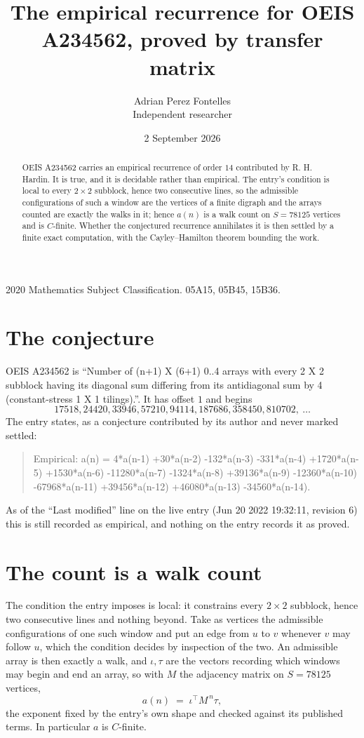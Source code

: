 \documentclass[11pt,a4paper]{article}
\title{The empirical recurrence for OEIS A234562, proved by transfer matrix}
\author{Adrian Perez Fontelles\\ \small Independent researcher}
\date{2 September 2026}
\theoremstyle{plain}
\theoremstyle{definition}
\begin{document}
\maketitle

\begin{abstract}
OEIS A234562 carries an empirical recurrence of order $14$ contributed by R. H. Hardin. It is
true, and it is decidable rather than empirical. The entry's condition is local to every $2\times2$ subblock, hence two consecutive lines, so
the admissible configurations of such a window are the vertices of a finite digraph and the
arrays counted are exactly the walks in it; hence $a(n)$ is a walk count on $S=78125$ vertices
and is $C$-finite. Whether the conjectured recurrence annihilates it is then settled by a
finite exact computation, with the Cayley--Hamilton theorem bounding the work.
\end{abstract}

\noindent\small 2020 Mathematics Subject Classification. 05A15, 05B45, 15B36.\normalsize

\section{The conjecture}

OEIS A234562 is ``Number of (n+1) X (6+1) 0..4 arrays with every 2 X 2 subblock having its diagonal sum differing from its antidiagonal sum by 4 (constant-stress 1 X 1 tilings).''. It has offset $1$ and begins
\[
17518, 24420, 33946, 57210, 94114, 187686, 358450, 810702,\ \dots
\]
The entry states, as a conjecture contributed by its author and never marked settled:
\begin{quote}
Empirical: a(n) = 4*a(n-1) +30*a(n-2) -132*a(n-3) -331*a(n-4) +1720*a(n-5) +1530*a(n-6) -11280*a(n-7) -1324*a(n-8) +39136*a(n-9) -12360*a(n-10) -67968*a(n-11) +39456*a(n-12) +46080*a(n-13) -34560*a(n-14).
\end{quote}
As of the ``Last modified'' line on the live entry (Jun 20 2022 19:32:11, revision 6) this is still
recorded as empirical, and nothing on the entry records it as proved.

\section{The count is a walk count}

The condition the entry imposes is local: it constrains every $2\times2$ subblock, hence two consecutive lines and nothing beyond. Take as vertices the admissible configurations of one such window and put an edge from $u$ to $v$ whenever $v$ may follow $u$, which the condition decides by inspection of the two.
An admissible array is then exactly a walk, and $\iota,\tau$ are the vectors recording which windows may begin and end an array, so with $M$ the adjacency matrix on $S=78125$ vertices,
\[
a(n)\;=\;\iota^{\!\top}M^{\,n}\tau ,
\]
the exponent fixed by the entry's own shape and checked against its published terms. In
particular $a$ is $C$-finite.
\end{document}
